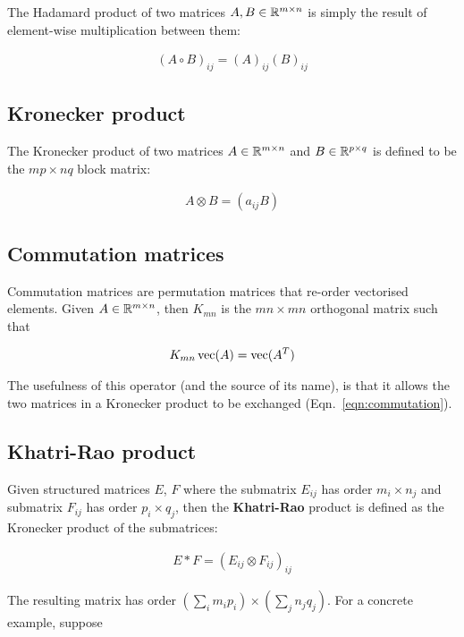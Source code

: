 The Hadamard product of two matrices $A,B \in \mathbb{R}^{m \times n}$ is simply the result of element-wise multiplication between them:

\begin{align*}
(A \circ B)_{ij} = (A)_{ij} (B)_{ij}
\end{align*}



\subsection{Kronecker product}

The Kronecker product of two matrices $A \in \mathbb{R}^{m \times n}$ and $B \in \mathbb{R}^{p \times q}$ is defined to be the $mp \times nq$ block matrix:

\begin{align}
A \otimes B = (a_{ij} B)
\end{align}

\subsection{Commutation matrices} \label{subsec:commutation}

Commutation matrices are permutation matrices that re-order vectorised elements.  Given $A \in \mathbb{R}^{m \times n}$, then $K_{mn}$ is the $mn \times mn$ orthogonal matrix such that

\begin{align*}
  K_{mn}\operatorname{vec}(A) = \operatorname{vec}(A^T)
\end{align*}

The usefulness of this operator (and the source of its name), is that it allows the two matrices in a Kronecker product to be exchanged (Eqn.~\ref{eqn:commutation}).

\subsection{Khatri-Rao product}

Given structured matrices $E$, $F$ where the submatrix $E_{ij}$ has order $m_i \times n_j$ and submatrix $F_{ij}$ has order $p_i \times q_j$, then the \mbox{\textbf{Khatri-Rao}} product is defined as the Kronecker product of the submatrices:

\begin{align*}
  E \ast F = (E_{ij} \otimes F_{ij})_{ij}
\end{align*}

The resulting matrix has order $(\sum_i m_i p_i) \times (\sum_j n_j q_j)$.  For a concrete example, suppose

